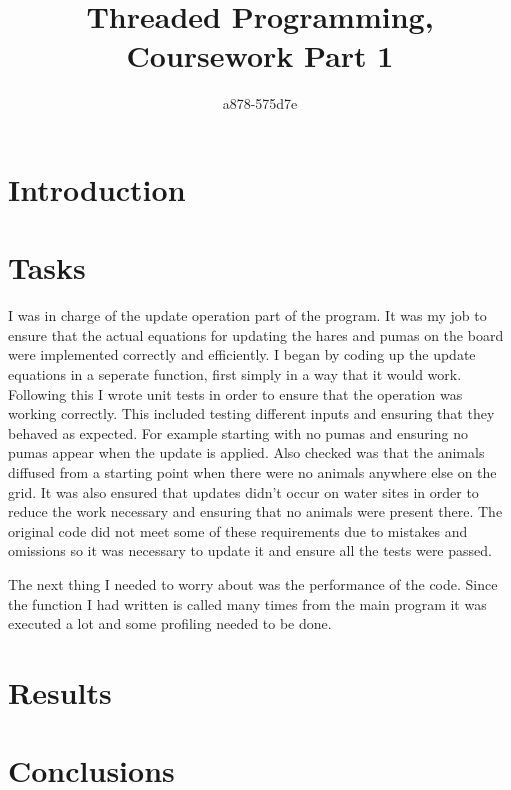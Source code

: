 \documentclass[12pt]{article}    %
\title{Threaded Programming, Coursework Part 1}  %
\author{a878-575d7e}    %
\date{}   %
\numberwithin{equation}{section}
\begin{document}

\maketitle                 %
\begin{center}

\abstract{}
\clearpage
{}
\end{center}

\section{Introduction}

\section{Tasks}
I was in charge of the update operation part of the program.
It was my job to ensure that the actual equations for updating the hares and pumas on the board were implemented correctly and efficiently.
I began by coding up the update equations in a seperate function, first simply in a way that it would work.
Following this I wrote unit tests in order to ensure that the operation was working correctly.
This included testing different inputs and ensuring that they behaved as expected.
For example starting with no pumas and ensuring no pumas appear when the update is applied.
Also checked was that the animals diffused from a starting point when there were no animals anywhere else on the grid.
It was also ensured that updates didn't occur on water sites in order to reduce the work necessary and ensuring that no animals were present there.
The original code did not meet some of these requirements due to mistakes and omissions so it was necessary to update it and ensure all the tests were passed.

The next thing I needed to worry about was the performance of the code.
Since the function I had written is called many times from the main program it was executed a lot and some profiling needed to be done.

\section{Results}

\section{Conclusions}
\end{document}
